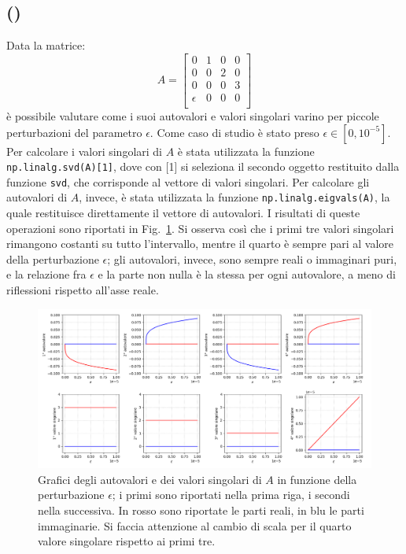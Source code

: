 \documentclass[a4paper]{article}
\newcounter{count_es}
\newcounter{count_sub_es}[count_es]
\renewcommand{\figurename}{Fig.}
\begin{document}
\subsection*{ ()}
Data la matrice:
\[A = \begin{bmatrix}
        0 & 1 & 0 & 0 \\
        0 & 0 & 2 & 0 \\
        0 & 0 & 0 & 3 \\
        \epsilon & 0 & 0 & 0 \\
    \end{bmatrix}\]
è possibile valutare come i suoi autovalori e valori singolari varino per piccole
perturbazioni del parametro \(\epsilon\). Come caso di studio è stato preso \(\epsilon \in [0, 10^{-5}]\).
Per calcolare i valori singolari di \(A\) è stata utilizzata la funzione
\lstinline{np.linalg.svd(A)[1]}, dove con [1] si seleziona il secondo oggetto 
restituito dalla funzione \lstinline{svd}, che corrisponde al vettore di valori singolari.
Per calcolare gli autovalori di \(A\), invece, è stata utilizzata la funzione
\lstinline{np.linalg.eigvals(A)}, la quale restituisce direttamente il vettore di autovalori.
I risultati di queste operazioni sono riportati in \figurename~\ref{fig:es_2a}.
Si osserva così che i primi tre valori singolari rimangono costanti su tutto
l'intervallo, mentre il quarto è sempre pari al valore della perturbazione \(\epsilon\); 
gli autovalori, invece, sono sempre reali o immaginari puri, e la relazione fra \(\epsilon\) e 
la parte non nulla è la stessa per ogni autovalore, a meno di riflessioni rispetto all'asse reale.
\begin{figure}[H]
    \centering
    \includegraphics[width=.95\linewidth]{Es_2a.png}
    \caption{Grafici degli autovalori e dei valori singolari di \(A\) in funzione della 
    perturbazione \(\epsilon\); i primi sono riportati nella prima riga, i secondi nella successiva.
    In rosso sono riportate le parti reali, in blu le parti immaginarie. Si faccia attenzione 
    al cambio di scala per il quarto valore singolare rispetto ai primi tre.\label{fig:es_2a}}
\end{figure}    
\end{document}
